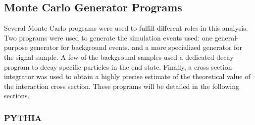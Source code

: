 
\subsection{Monte Carlo Generator Programs}
\label{sim:MCGens}



Several Monte Carlo programs were used to fulfill 
different roles in this analysis.  
Two programs were used to generate the simulation events used: 
one general-purpose generator for background events, 
and a more specialized generator for the signal sample.  
A few of the background samples used a dedicated decay 
program to decay specific particles in the end state.  
Finally, a cross section integrator was used to 
obtain a highly precise estimate of the theoretical 
value of the interaction cross section.  
These programs will be detailed in the following sections.  




\subsubsection{PYTHIA}
\label{sim:MCGensPythia}


